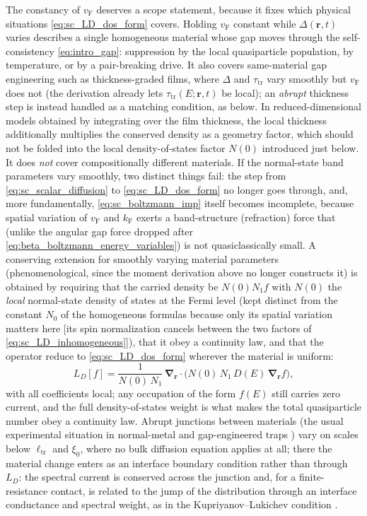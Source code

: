 \documentclass[
  aps,
  prb,
  preprint,
  superscriptaddress,
  longbibliography,
  nofootinbib
]{revtex4-2}
\newcommand{\br}{\mathbf{r}}
\newcommand{\bnabla}{\boldsymbol{\nabla}}
\newcommand{\vF}{v_{\mathrm{F}}}
\newcommand{\tautr}{\tau_{\mathrm{tr}}}
\newcommand{\elltr}{\ell_{\mathrm{tr}}}
\newcommand{\DOS}{N_1}
\newcommand{\DE}{D(E)}
\newcommand{\LD}{L_D}
\begin{document}
The constancy of \(\vF\) deserves a scope statement, because it fixes
which physical situations \cref{eq:sc_LD_dos_form} covers. Holding
\(\vF\) constant while \(\Delta(\br,t)\) varies describes a single
homogeneous material whose gap moves through the self-consistency
\cref{eq:intro_gap}: suppression by the local quasiparticle
population, by temperature, or by a pair-breaking drive. It also
covers same-material gap engineering such as thickness-graded films,
where \(\Delta\) and \(\tautr\) vary smoothly but \(\vF\) does not (the
derivation already lets \(\tautr(E;\br,t)\) be local); an \emph{abrupt}
thickness step is instead handled as a matching condition, as below. In
reduced-dimensional models obtained by integrating over the film
thickness, the local thickness additionally multiplies the conserved
density as a geometry factor, which should not be folded into the
local density-of-states factor \(N(0)\) introduced just below. It does
\emph{not} cover compositionally different materials. If the
normal-state band parameters vary smoothly, two distinct things fail:
the step from \cref{eq:sc_scalar_diffusion} to
\cref{eq:sc_LD_dos_form} no longer goes through, and, more
fundamentally, \cref{eq:sc_boltzmann_imp} itself becomes incomplete,
because spatial variation of \(\vF\) and \(k_{\mathrm F}\) exerts a
band-structure (refraction) force that (unlike the angular gap force
dropped after \cref{eq:beta_boltzmann_energy_variables}) is not quasiclassically small.
A conserving extension for smoothly varying material
parameters (phenomenological, since the moment derivation above no
longer constructs it) is obtained by requiring that the carried
density be \(N(0)\DOS f\) with \(N(0)\) the \emph{local} normal-state
density of states at the Fermi level (kept distinct from the constant
\(N_0\) of the homogeneous formulas because only its spatial variation
matters here [its spin normalization cancels between the two factors of
\cref{eq:sc_LD_inhomogeneous}]), that it obey a continuity law, and that
the operator reduce to \cref{eq:sc_LD_dos_form} wherever the material
is uniform:
\begin{equation}
  \LD[f]
  =
  \frac{1}{N(0)\,\DOS}\,
  \bnabla_{\br}\cdot
  \bigl(
    N(0)\,\DOS\,\DE\,
    \bnabla_{\br} f
  \bigr),
  \label{eq:sc_LD_inhomogeneous}
\end{equation}
with all coefficients local; any occupation of the form \(f(E)\) still
carries zero current, and the full density-of-states weight is what
makes the total quasiparticle number obey a continuity law. Abrupt
junctions between materials (the usual experimental situation in
normal-metal and gap-engineered traps
\cite{riwar2016,hosseinkhani2018,riwar2019}) vary on scales below
\(\elltr\) and \(\xi_0\), where no bulk diffusion equation applies at
all; there the material change enters as an interface boundary
condition rather than through \(\LD\): the spectral current is
conserved across the junction and, for a finite-resistance contact,
is related to the jump of the distribution through an interface
conductance and spectral weight, as in the Kupriyanov--Lukichev
condition \cite{kupriyanov1988}.
\end{document}
